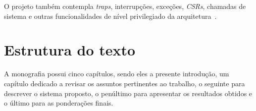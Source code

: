 { O projeto também contempla \textit{traps}, interrupções, exceções,
    \textit{CSRs}, chamadas de sistema e outras funcionalidades de nível
    privilegiado da arquitetura~\cite{riscv_spec2}.
}

\section{Estrutura do texto}
{ A monografia possui cinco capítulos, sendo eles a presente introdução, um
    capítulo dedicado a revisar os assuntos pertinentes ao trabalho, o seguinte
    para descrever o sistema proposto, o penúltimo para apresentar os resultados
    obtidos e o último para as ponderações finais.
}

